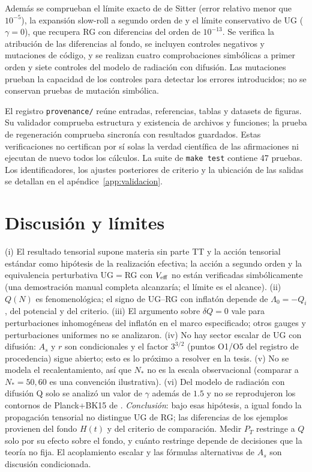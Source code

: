 \documentclass[11pt,a4paper]{article}
\numberwithin{equation}{section}
\begin{document}
Además se comprueban el límite exacto de de Sitter (error relativo menor que $10^{-5}$), la expansión slow-roll a segundo orden de \cite{martin14} y el límite conservativo de UG ($\gamma=0$), que recupera RG con diferencias del orden de $10^{-13}$. Se verifica la atribución de las diferencias al fondo, se incluyen controles negativos y mutaciones de código, y se realizan cuatro comprobaciones simbólicas a primer orden y siete controles del modelo de radiación con difusión. Las mutaciones prueban la capacidad de los controles para detectar los errores introducidos; no se conservan pruebas de mutación simbólica.

El registro \texttt{provenance/} reúne entradas, referencias, tablas y datasets de figuras. Su validador comprueba estructura y existencia de archivos y funciones; la prueba de regeneración comprueba sincronía con resultados guardados. Estas verificaciones no certifican por sí solas la verdad científica de las afirmaciones ni ejecutan de nuevo todos los cálculos. La suite de \texttt{make test} contiene 47 pruebas. Los identificadores, los ajustes posteriores de criterio y la ubicación de las salidas se detallan en el apéndice~\ref{app:validacion}.

\section{Discusi\'on y l\'imites}
(i) El resultado tensorial supone materia sin parte TT y la acci\'on tensorial est\'andar como hip\'otesis de la realizaci\'on efectiva; la acci\'on a segundo orden y la equivalencia perturbativa UG$=$RG con $V_{\rm eff}$ no est\'an verificadas simb\'olicamente (una demostraci\'on manual completa alcanzar\'ia; el l\'imite es el alcance). (ii) $Q(N)$ es fenomenol\'ogica; el signo de UG--RG con inflat\'on depende de $\Lambda_0=-Q_i$, del potencial y del criterio. (iii) El argumento sobre $\delta Q=0$ vale para perturbaciones inhomog\'eneas del inflat\'on en el marco especificado; otros gauges y perturbaciones uniformes no se analizaron. (iv) No hay sector escalar de UG con difusi\'on: $A_s$ y $r$ son condicionales y el factor $3^{3/2}$ (puntos O1/O5 del registro de procedencia) sigue abierto; esto es lo pr\'oximo a resolver en la tesis. (v) No se modela el recalentamiento, as\'i que $N_*$ no es la escala observacional (comparar a $N_*=50,60$ es una convenci\'on ilustrativa). (vi) Del modelo de radiación con difusión Q \cite{leon22,piccirilli23} solo se analiz\'o un valor de $\gamma$ adem\'as de $1.5$ y no se reprodujeron los contornos de Planck+BK15 de \cite{piccirilli23}. \emph{Conclusi\'on}: bajo esas hip\'otesis, a igual fondo la propagaci\'on tensorial no distingue UG de RG; las diferencias de los ejemplos provienen del fondo $H(t)$ y del criterio de comparaci\'on. Medir $P_T$ restringe a $Q$ solo por su efecto sobre el fondo, y cu\'anto restringe depende de decisiones que la teor\'ia no fija. El acoplamiento escalar y las f\'ormulas alternativas de $A_s$ son discusi\'on condicionada.
\end{document}
